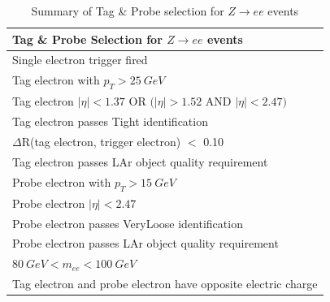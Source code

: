 \begin{table}[h]
\footnotesize
\renewcommand{\arraystretch}{1.3}
\begin{center}
\begin{tabular}{l}
\textbf{Tag \& Probe Selection for $Z\rightarrow ee$ events} \\
\hline
Single electron trigger fired \\
\midrule
 Tag electron with $p_T > 25~GeV$ \\
	    Tag electron $|\eta| < 1.37$ OR $(|\eta| > 1.52$ AND $|\eta| < 2.47)$ \\
	    Tag electron passes Tight identification \\
	    $\Delta$R(tag electron, trigger electron) $<$ 0.10 \\
	    Tag electron passes LAr object quality requirement \\
	\midrule
	    Probe electron with $p_T > 15~GeV$ \\
	    Probe electron $|\eta| < 2.47$ \\
	    Probe electron passes VeryLoose identification \\
	    Probe electron passes LAr object quality requirement \\
	\midrule
	    $80~GeV < m_{ee} < 100~ GeV$ \\
	    Tag electron and probe electron have opposite electric charge \\
	\hline
	\end{tabular}
	\end{center}
	  \caption{Summary of Tag \& Probe selection for $Z\rightarrow ee$ events}
	\label{tab:tp_Z}
	\end{table}

